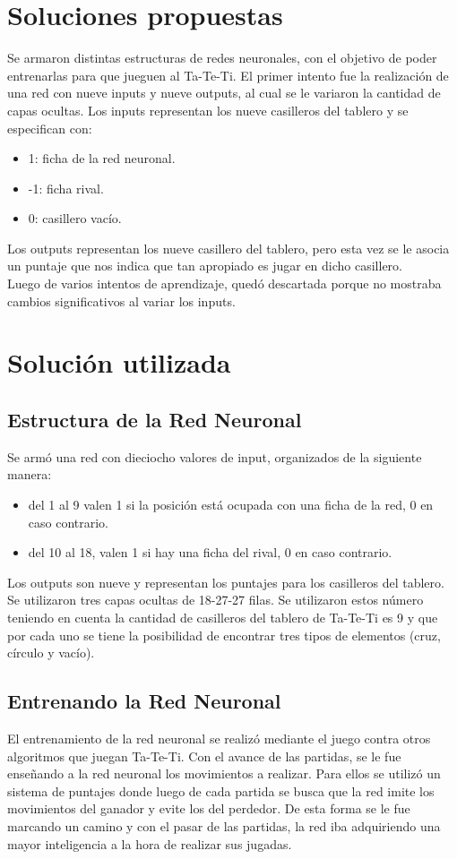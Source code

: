 \documentclass[12pt,titlepage]{article}
\begin{document}
\section{Soluciones propuestas}
Se armaron distintas estructuras de redes neuronales, con el objetivo de poder entrenarlas para que jueguen al Ta-Te-Ti. El primer intento fue la realizaci\'on de una red con nueve inputs y nueve outputs, al cual se le variaron la cantidad de capas ocultas. Los inputs representan los nueve casilleros del tablero y se especifican con:
\begin{itemize}
 \item 1: ficha de la red neuronal.
 \item -1: ficha rival.
 \item 0: casillero vac\'io.
\end{itemize}
Los outputs representan los nueve casillero del tablero, pero esta vez se le asocia un puntaje que nos indica que tan apropiado es jugar en dicho casillero. \\
Luego de varios intentos de aprendizaje, qued\'o descartada porque no mostraba cambios significativos al variar los inputs. 

\section{Soluci\'on utilizada}
\subsection{Estructura de la Red Neuronal}
Se arm\'o una red con dieciocho valores de input, organizados de la siguiente manera:
\begin{itemize}
 \item del 1 al 9 valen 1 si la posición está ocupada con una ficha de la red, 0 en caso contrario.
 \item del 10 al 18, valen 1 si hay una ficha del rival, 0 en caso contrario.
\end{itemize}
Los outputs son nueve y representan los puntajes para los casilleros del tablero. Se utilizaron tres capas ocultas de 18-27-27 filas. Se utilizaron estos n\'umero teniendo en cuenta la cantidad de casilleros del tablero de Ta-Te-Ti es 9 y que por cada uno se tiene la posibilidad de encontrar tres tipos de elementos (cruz, c\'irculo y vac\'io).

\subsection{Entrenando la Red Neuronal}
El entrenamiento de la red neuronal se realiz\'o mediante el juego contra otros algoritmos que juegan Ta-Te-Ti. Con el avance de las partidas, se le fue ense\~nando a la red neuronal los movimientos a realizar. Para ellos se utiliz\'o un sistema de puntajes donde luego de cada partida se busca que la red imite los movimientos del ganador y evite los del perdedor. De esta forma se le fue marcando un camino y con el pasar de las partidas, la red iba adquiriendo una mayor inteligencia a la hora de realizar sus jugadas. \\ 
\end{document}
